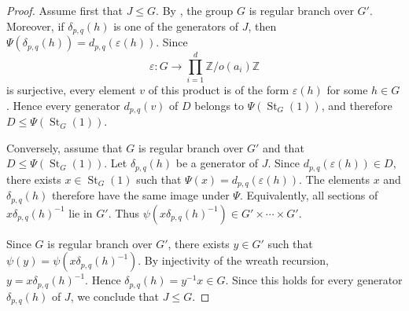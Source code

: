 \documentclass[11pt,leqno]{amsart}
\theoremstyle{plain}
\DeclareMathOperator{\St}{St}
\numberwithin{equation}{section}
\begin{document}
\begin{proof}
    Assume first that $J\leq G$. By , the group $G$ is regular branch over $G'$. Moreover, if $\delta_{p,q}(h)$ is one of the generators of $J$, then
    $\Psi(\delta_{p,q}(h))=d_{p,q}(\varepsilon(h))$.
    Since 
    $$\varepsilon:G\to \prod_{i=1}^d \mathbb Z/o(a_i)\mathbb Z$$
    is surjective, every element $v$ of this product is of the form $\varepsilon(h)$ for some $h\in G$. Hence every generator $d_{p,q}(v)$ of $D$ belongs to $\Psi(\St_G(1))$, and therefore $D\leq \Psi(\St_G(1))$.

    Conversely, assume that $G$ is regular branch over $G'$ and that $D\leq \Psi(\St_G(1))$. Let $\delta_{p,q}(h)$ be a generator of $J$. Since $d_{p,q}(\varepsilon(h))\in D$, there exists $x\in \St_G(1)$ such that
    $\Psi(x)=d_{p,q}(\varepsilon(h))$.
    The elements $x$ and $\delta_{p,q}(h)$ therefore have the same image under $\Psi$. Equivalently, all sections of $x\delta_{p,q}(h)^{-1}$ lie in $G'$. Thus
    $\psi(x\delta_{p,q}(h)^{-1})\in G'\times \cdots \times G'$.

    Since $G$ is regular branch over $G'$, there exists $y\in G'$ such that
    $\psi(y)=\psi(x\delta_{p,q}(h)^{-1})$.
    By injectivity of the wreath recursion, $y=x\delta_{p,q}(h)^{-1}$. Hence
    $\delta_{p,q}(h)=y^{-1}x\in G$.
    Since this holds for every generator $\delta_{p,q}(h)$ of $J$, we conclude that $J\leq G$.
\end{proof}
\end{document}
